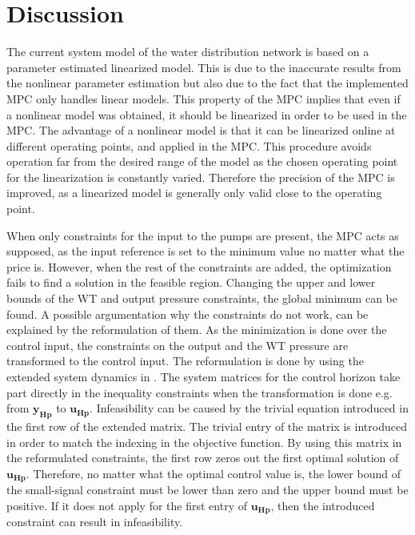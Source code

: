 \chapter{Discussion}
\label{Discussion}

The current system model of the water distribution network is based on a parameter estimated linearized model. This is due to the inaccurate results from the nonlinear parameter estimation but also due to the fact that the implemented MPC only handles linear models. This property of the MPC implies that even if a nonlinear model was obtained, it should be linearized in order to be used in the MPC. The advantage of a nonlinear model is that it can be linearized online at different operating points, and applied in the MPC. This procedure avoids operation far from the desired range of the model as the chosen operating point for the linearization is constantly varied. Therefore the precision of the MPC is improved, as a linearized model is generally only valid close to the operating point.    

When only constraints for the input to the pumps are present, the MPC acts as supposed, as the input reference is set to the minimum value no matter what the price is. However, when the rest of the constraints are added, the optimization fails to find a solution in the feasible region. Changing the upper and lower bounds of the WT and output pressure constraints, the global minimum can be found. 
A possible argumentation why the constraints do not work, can be explained by the reformulation of them. As the minimization is done over the control input, the constraints on the output and the WT pressure are transformed to the control input. The reformulation is done by using the extended system dynamics in . The system matrices for the control horizon take part directly in the inequality constraints when the transformation is done e.g. from $\bm{y_{Hp}}$ to $\bm{u_{Hp}}$. Infeasibility can be caused by the trivial equation introduced in the first row of the extended matrix. The trivial entry of the matrix is introduced in order to match the indexing in the objective function. By using this matrix in the reformulated constraints, the first row zeros out the first optimal solution of $\bm{u_{Hp}}$. Therefore, no matter what the optimal control value is, the lower bound of the small-signal constraint must be lower than zero and the upper bound must be positive. If it does not apply for the first entry of $\bm{u_{Hp}}$, then the introduced constraint can result in infeasibility. 

